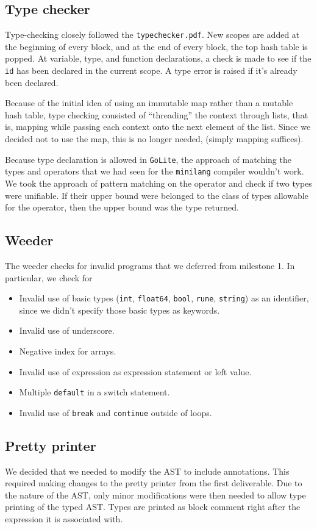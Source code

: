 \documentclass{article}
\begin{document}
\subsection*{Type checker}
Type-checking closely followed the \verb|typechecker.pdf|. New scopes are added at the beginning of every block, and at the end of every block, the top hash table is popped. At variable, type, and function declarations, a check is made to see if the \verb|id| has been declared in the current scope. A type error is raised if it's already been declared.

Because of the initial idea of using an immutable map rather than a mutable hash table, type checking consisted of ``threading'' the context through lists, that is, mapping while passing each context onto the next element of the list. Since we decided not to use the map, this is no longer needed, (simply mapping suffices).

Because type declaration is allowed in \verb|GoLite|, the approach of matching the types and operators that we had seen for the \verb|minilang| compiler wouldn't work. We took the approach of pattern matching on the operator and check if two types were unifiable. If their upper bound were belonged to the class of types allowable for the operator, then the upper bound was the type returned.

\subsection*{Weeder}
The weeder checks for invalid programs that we deferred from milestone 1. In particular, we check for
\begin{itemize}
	\item Invalid use of basic types (\verb|int|, \verb|float64|, \verb|bool|, \verb|rune|, \verb|string|) as an identifier, since we didn't specify those basic types as keywords.
	\item Invalid use of underscore.
	\item Negative index for arrays.
	\item Invalid use of expression as expression statement or left value.
	\item Multiple \verb|default| in a switch statement.
	\item Invalid use of \verb|break| and \verb|continue| outside of loops.
\end{itemize}

\subsection*{Pretty printer}
We decided that we needed to modify the AST to include annotations. This required making changes to the pretty printer from the first deliverable. Due to the nature of the AST, only minor modifications were then needed to allow type printing of the typed AST. Types are printed as block comment right after the expression it is associated with.
\end{document}
